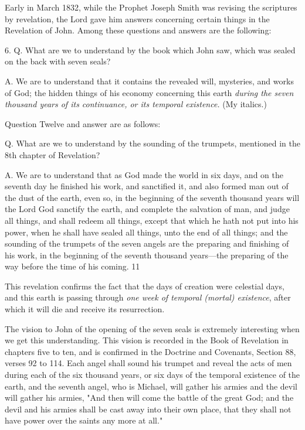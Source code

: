 Early in March 1832, while the Prophet Joseph Smith was revising the scriptures by
revelation, the Lord gave him answers concerning certain things in the Revelation of John.
Among these questions and answers are the following:

6. Q. What are we to understand by the book which John saw, which was sealed on the back
with seven seals?

A. We are to understand that it contains the revealed will, mysteries, and works of God; the
hidden things of his economy concerning this earth \textit{during the seven thousand years of its
continuance, or its temporal existence.} (My italics.)

Question Twelve and answer are as follows:

Q. What are we to understand by the sounding of the trumpets, mentioned in the 8th chapter
of Revelation?

A. We are to understand that as God made the world in six days, and on the seventh day he
finished his work, and sanctified it, and also formed man out of the dust of the earth, even so,
in the beginning of the seventh thousand years will the Lord God sanctify the earth, and
complete the salvation of man, and judge all things, and shall redeem all things, except that
which he hath not put into his power, when he shall have sealed all things, unto the end of all
things; and the sounding of the trumpets of the seven angels are the preparing and finishing
of his work, in the beginning of the seventh thousand years—the preparing of the way before
the time of his coming. 11

This revelation confirms the fact that the days of creation were celestial days, and this earth
is passing through \textit{one week of temporal (mortal) existence}, after which it will die and
receive its resurrection.

The vision to John of the opening of the seven seals is extremely interesting when we get this
understanding. This vision is recorded in the Book of Revelation in chapters five to ten, and
is confirmed in the Doctrine and Covenants, Section 88, verses 92 to 114. Each angel shall
sound his trumpet and reveal the acts of men during each of the six thousand years, or six
days of the temporal existence of the earth, and the seventh angel, who is Michael, will
gather his armies and the devil will gather his armies, "And then will come the battle of the
great God; and the devil and his armies shall be cast away into their own place, that they
shall not have power over the saints any more at all."

